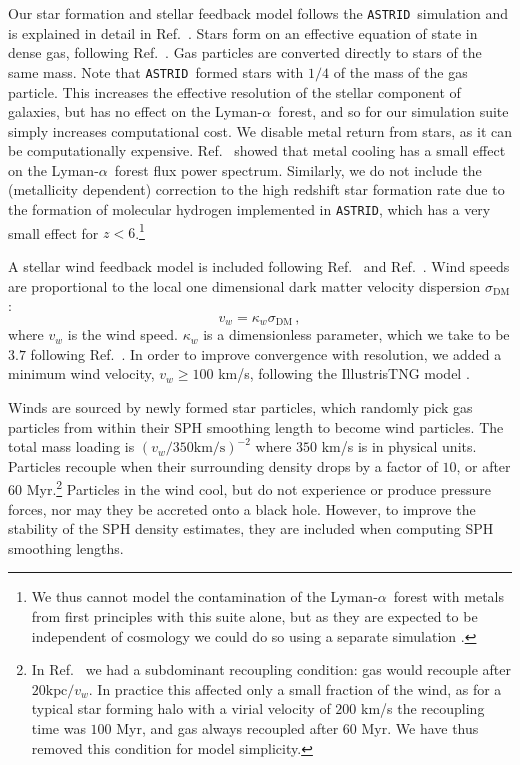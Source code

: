 \documentclass[a4paper,11pt]{article}
\newcommand{\Lya}{Lyman-$\alpha$}
\newcommand{\astrid}{\texttt{ASTRID}}
\begin{document}
Our star formation and stellar feedback model follows the \astrid~simulation and is explained in detail in Ref.~\cite{Bird:2022}.
Stars form on an effective equation of state in dense gas, following Ref.~\cite{Springel:2003}. Gas particles are converted directly to stars of the same mass. Note that \astrid~formed stars with $1/4$ of the mass of the gas particle. This increases the effective resolution of the stellar component of galaxies, but has no effect on the \Lya~forest, and so for our simulation suite simply increases computational cost. We disable metal return from stars, as it can be computationally expensive. Ref.~\cite{Viel:2013} showed that metal cooling has a small effect on the \Lya~forest flux power spectrum. Similarly, we do not include the (metallicity dependent) correction to the high redshift star formation rate due to the formation of molecular hydrogen implemented in \astrid, which has a very small effect for $z < 6$.\footnote{We thus cannot model the contamination of the \Lya~forest with metals from first principles with this suite alone, but as they are expected to be independent of cosmology we could do so using a separate simulation \cite[e.g. ASTRID~][]{Ni:2021, Bird:2022}.} %

A stellar wind feedback model is included following Ref.~\citep{Okamoto:2010} and Ref.~\cite{Bird:2022}. Wind speeds are proportional to the local one dimensional dark matter velocity dispersion $\sigma_\mathrm{DM}$:
\begin{equation}
v_w = \kappa_w \sigma_\mathrm{DM} \,,
\end{equation}
where $v_w$ is the wind speed. $\kappa_w$ is a dimensionless parameter, which we take to be $3.7$ following Ref.~\cite{Vogelsberger:2013}. In order to improve convergence with resolution, we added a minimum wind velocity, $v_w \geq 100$ km/s, following the IllustrisTNG model \cite{Pillepich:2018}.

Winds are sourced by newly formed star particles, which randomly pick gas particles from within their SPH smoothing length to become wind particles. The total mass loading is $(v_w/ 350 \mathrm{km/s})^{-2}$ where $350$ km/s is in physical units. Particles recouple when their surrounding density drops by a factor of $10$, or after $60$ Myr.\footnote{In Ref.~\cite{Bird:2022} we had a subdominant recoupling condition: gas would recouple after $20 \mathrm{kpc} / v_w$. In practice this affected only a small fraction of the wind, as for a typical star forming halo with a virial velocity of $200$ km/s the recoupling time was $100$ Myr, and gas always recoupled after $60$ Myr. We have thus removed this condition for model simplicity.} Particles in the wind cool, but do not experience or produce pressure forces, nor may they be accreted onto a black hole. However, to improve the stability of the SPH density estimates, they are included when computing SPH smoothing lengths.
\end{document}
